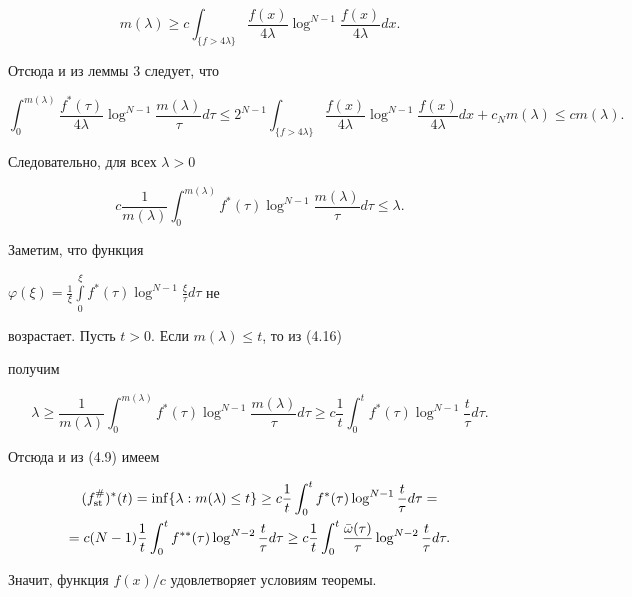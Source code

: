 \begin{pf}
$$ 


m(\lambda) \ge c\int_{\{f>4\lambda\}}\frac{f(x)}{4\lambda} 


\log^{N-1}\frac{f(x)}{4\lambda}dx. 


$$ 


Отсюда и из леммы 3 следует, что 


$$ 


\int_0^{m(\lambda)}\frac{f^*(\tau)}{4\lambda}\log^{N-1} 


\frac{m(\lambda)}{\tau}d\tau \le 2^{N-1} 


\int_{\{f>4\lambda\}}\frac{f(x)}{4\lambda}\log^{N-1} 


\frac{f(x)}{4\lambda}dx +c_N m(\lambda) \le cm(\lambda). 


$$ 


Следовательно, для всех $\lambda>0$ 


\begin{equation} 


c\frac{1}{m(\lambda)}\int_0^{m(\lambda)}f^*(\tau)\log^{N-1} 


\frac{m(\lambda)}{\tau}d\tau \le \lambda. 


\end{equation} 


 


Заметим, что функция 


$\varphi(\xi)=\frac{1}{\xi}\int\limits_0^\xi f^*(\tau)\log^{N-1} 


\frac{\xi}{\tau}d\tau$ не 


возрастает. Пусть $t>0$. Если $m(\lambda)\le t$, то из (4.16) 


получим 


$$ 


\lambda\ge\frac{1}{m(\lambda)}\int_0^{m(\lambda)}f^*(\tau) 


\log^{N-1}\frac{m(\lambda)}{\tau}d\tau \ge 


c\frac{1}{t}\int_0^t f^*(\tau)\log^{N-1}\frac{t}{\tau}d\tau. 


$$ 


Отсюда и из (4.9) имеем 


\begin{gather*} 


(f_{\st}^\#)^*(t)=\inf\{\lambda:m(\lambda)\le t\}\ge c\frac{1}{t} 


\int_0^t f^*(\tau)\log^{N-1}\frac{t}{\tau}d\tau = \\ 


% 


=c(N-1)\frac{1}{t}\int_0^t f^{**}(\tau)\log^{N-2}\frac{t}{\tau}d\tau \ge 


c\frac{1}{t}\int_0^t\frac{\Bar\omega(\tau)}{\tau}\log^{N-2} 


\frac{t}{\tau}d\tau. 


\end{gather*} 


Значит, функция $f(x)/c$ удовлетворяет условиям теоремы. 


\end{pf} 


